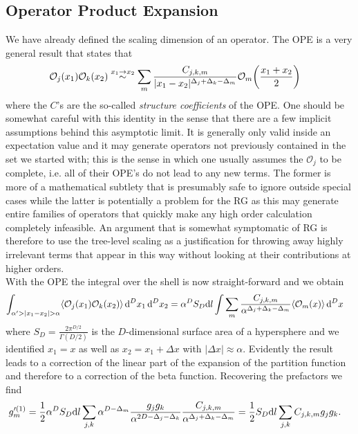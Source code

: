 \documentclass[english, parskip=full]{scrartcl}
\begin{document}
\subsection{Operator Product Expansion}
We have already defined the scaling dimension of an operator.
The OPE is a very general result that states that
\begin{align}
\mathcal{O}_j(x_1) \mathcal{O}_k(x_2) &\overset{x_1\rightarrow x_2}{\sim} \sum_m \frac{C_{j,k,m}}{|x_1-x_2|^{\Delta_{j} + \Delta_{k} - \Delta_{m}}} \mathcal{O}_m\kla*{\frac{x_1+x_2}{2}}
\end{align}
where the $C$'s are the so-called \emph{structure coefficients} of the OPE.
One should be somewhat careful with this identity in the sense that there are a few implicit assumptions behind this asymptotic limit.
It is generally only valid inside an expectation value and it may generate operators not previously contained in the set we started with; this is the sense in which one usually assumes the $\mathcal{O}_j$ to be complete, i.e. all of their OPE's do not lead to any new terms.
The former is more of a mathematical subtlety that is presumably safe to ignore outside special cases while the latter is potentially a problem for the RG as this may generate entire families of operators that quickly make any high order calculation completely infeasible.
An argument that is somewhat symptomatic of RG is therefore to use the tree-level scaling as a justification for throwing away highly irrelevant terms that appear in this way without looking at their contributions at higher orders.\\
With the OPE the integral over the shell is now straight-forward and we obtain
\begin{align}
\int_{\alpha' > |x_1-x_2| > \alpha} \bra*{\mathcal{O}_j(x_1) \mathcal{O}_k(x_2)}\,\d^Dx_1\,\d^Dx_2 &= \alpha^D S_D \d l\int \sum_m \frac{C_{j,k,m}}{\alpha^{\Delta_{j} + \Delta_{k} - \Delta_{m}}} \bra*{\mathcal{O}_m(x)} \,\d^Dx \label{eqn:1loop shell integral OPE}
\end{align}
where $S_D = \frac{2\pi^{D/2}}{\Gamma(D/2)}$ is the $D$-dimensional surface area of a hypersphere and we identified $x_1=x$ as well as $x_2=x_1+\Delta x$ with $|\Delta x| \approx \alpha$.
Evidently the result leads to a correction of the linear part of the expansion of the partition function and therefore to a correction of the beta function.
Recovering the prefactors we find
\begin{align}
g_m'^{(1)} &= \frac{1}{2} \alpha^D S_D \text{d} l \sum_{j,k} \alpha^{D-\Delta_{m}} \frac{g_jg_k}{\alpha^{2D - \Delta_{j} - \Delta_{k}}} \frac{C_{j,k,m}}{\alpha^{\Delta_{j} + \Delta_{k} - \Delta_{m}}} = \frac{1}{2} S_D \text{d} l \sum_{j,k} C_{j,k,m} g_jg_k.
\end{align}
\end{document}
